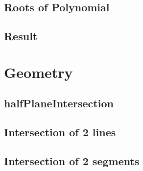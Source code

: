 \documentclass[a4paper,10pt,twocolumn,oneside]{article}
\begin{document}
\subsection{Roots of Polynomial}


%

%

\subsection{Result}


\section{Geometry}

% 

\subsection{halfPlaneIntersection}
\subsection{Intersection of 2 lines}
% 


% 

% 

\subsection{Intersection of 2 segments}

\end{document}
